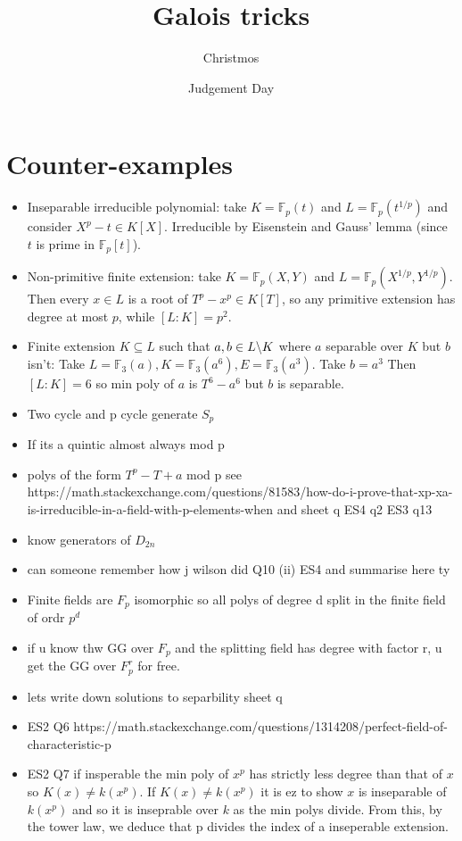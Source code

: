 \documentclass{article}
\title{Galois tricks}
\author{Christmos}
\date{Judgement Day}
\begin{document}
\maketitle


\section{Counter-examples}

\begin{itemize}
    \item Inseparable irreducible polynomial: take $K = \mathbb{F}_{p}(t)$ and $L = \mathbb{F}_p(t^{1/p})$ and consider $X^p-t \in K[X]$. Irreducible by Eisenstein and Gauss' lemma (since $t$ is prime in $\mathbb{F}_p[t]$).
    \item Non-primitive finite extension: take $K = \mathbb{F}_{p}(X,Y)$ and $L = \mathbb{F}_p(X^{1/p},Y^{1/p})$. Then every $x \in L$ is a root of $T^p-x^p \in K[T]$, so any primitive extension has degree at most $p$, while $[L:K] = p^2$.
    \item Finite extension $K \subseteq L$ such that $a,b \in L\symbol{92}K$ where $a$ separable over $K$ but $b$ isn't: Take $L=\mathbb{F}_3(a), K=\mathbb{F}_3(a^6), E=\mathbb{F}_3(a^3)$. Take $b=a^3$ Then $[L:K]=6$ so min poly of $a$ is $T^6-a^6$ but $b$ is separable.
        \item Two cycle and p cycle generate $S_p$
        \item If its a quintic almost always mod p
        \item polys of the form $T^p-T+a$ mod p see https://math.stackexchange.com/questions/81583/how-do-i-prove-that-xp-xa-is-irreducible-in-a-field-with-p-elements-when and sheet q ES4 q2 ES3 q13 
        \item know generators of $D_{2n}$
        \item can someone remember how j wilson did Q10 (ii) ES4 and summarise here ty
        \item Finite fields are $F_p$ isomorphic so all polys of degree d split in the finite field of ordr $p^d$
        \item if u know thw GG over $F_p$ and the splitting field has degree with factor r, u get the GG over $F_p^r$ for free.
        \item lets write down solutions to separbility sheet q
        \item ES2 Q6 https://math.stackexchange.com/questions/1314208/perfect-field-of-characteristic-p
        \item ES2 Q7 if insperable the min poly of $x^p$ has strictly less degree than that of $x$ so $K(x) \neq k(x^p)$. If $K(x) \neq k(x^p)$ it is ez to show $x$ is inseparable of $k(x^p)$ and so it is inseprable over $k$ as the min polys divide. From this, by the tower law, we deduce that p divides the index of a inseperable extension.

\end{itemize}
\end{document}
